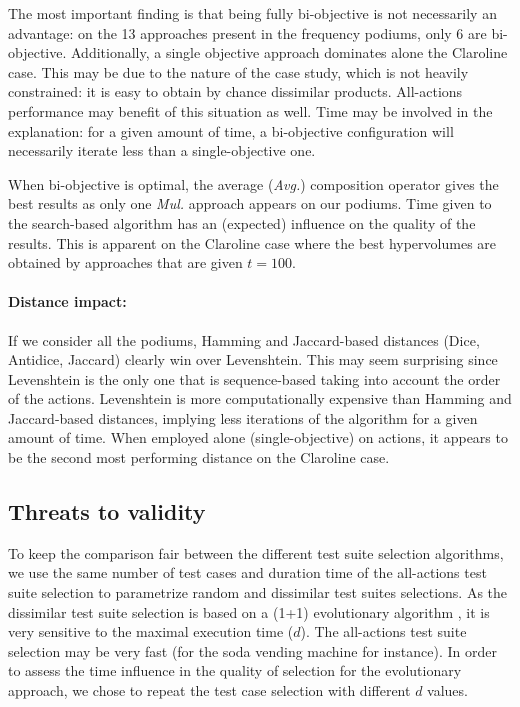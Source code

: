 The most important finding is that being fully bi-objective is not necessarily an advantage: on the 13 approaches present in the frequency podiums, only 6 are bi-objective. Additionally, a single objective approach dominates alone the Claroline case. This may be due to the nature of the case study, which is not heavily constrained: it is easy to obtain by chance dissimilar products. All-actions performance may benefit of this situation as well. Time may  be involved in the explanation: for a given amount of time, a bi-objective configuration will necessarily iterate less than a single-objective one.  

When bi-objective is optimal, the average (\textit{Avg.}) composition operator gives the best results as only one \textit{Mul.} approach appears on our podiums. Time given to the search-based algorithm has an (expected)  influence on the quality of the results.  This is apparent on the Claroline case where the best hypervolumes  are obtained by approaches that are given $t=100$.       

\paragraph{Distance impact:}

If we consider all the podiums, Hamming and Jaccard-based distances (Dice, Antidice, Jaccard)  clearly win over Levenshtein.  This may seem surprising since Levenshtein  is the only one that is sequence-based taking into account the order of the actions.  Levenshtein is more computationally expensive than Hamming and Jaccard-based distances, implying less iterations of the algorithm for a given amount of time.  When employed alone (single-objective) on actions, it appears to be the second most performing distance on the Claroline case.       


\subsection{Threats to validity} 


To keep the comparison fair between the different test suite selection algorithms, we use the same number of test cases and duration time of the all-actions test suite selection to parametrize random and dissimilar test suites selections. As the dissimilar test suite selection is based on a (1+1) evolutionary algorithm \cite{Droste2002}, it is very sensitive to the maximal execution time ($d$). The all-actions test suite selection may be very fast (for the soda vending machine for instance). In order to assess the time influence in the quality of selection for the evolutionary approach, we chose to repeat the test case selection with different $d$ values.

